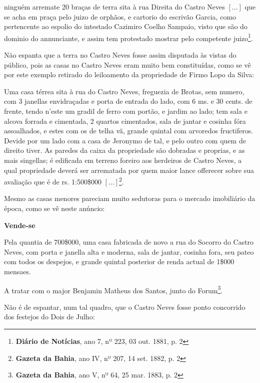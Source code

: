 \begin{citacao}
ninguém arremate 20 braças de terra sita à rua Direita do Castro Neves \([\dots]\) que se acha em praça pelo juizo de orphãos, e cartorio do escrivão Garcia, como pertencente ao espolio do intestado Cazimiro Coelho Sampaio, visto que são do dominio do annunciante, e assim tem protestado mostrar pelo competente juizo\footnote{\textbf{Diário de Notícias}, ano 7, nº 223, 03 out. 1881, p. 2}.
\end{citacao}

Não espanta que a terra no Castro Neves fosse assim disputada às vistas do público, pois as casas no Castro Neves eram muito bem constituídas, como se vê por este exemplo retirado do leiloamento da propriedade de Firmo Lopo da Silva:

\begin{citacao}
Uma casa térrea sita à rua do Castro Neves, freguezia de Brotas, sem numero, com 3 janellas envidraçadas e porta de entrada do lado, com 6 ms. e 30 cents. de frente, tendo n'este um gradil de ferro com portão, e jardim ao lado; tem sala e alcova forrada e cimentada, 2 quartos cimentados, sala de jantar e cosinha fóra assoalhados, e estes com os de telha vã, grande quintal com arvoredos fructiferos. Devide por um lado com a casa de Jeronymo de tal, e pelo outro com quem de direito tiver. As paredes da caixa da propriedade são dobradas e proprias, e as mais singellas; é edificada em terreno foreiro aos herdeiros de Castro Neves, a qual propriedade deverá ser arrematada por quem maior lance offerecer sobre sua avaliação que é de rs. 1:500\$000 \([\dots]\)\footnote{\textbf{Gazeta da Bahia}, ano IV, nº 207, 14 set. 1882, p. 2}.
\end{citacao}

Mesmo as casas menores pareciam muito sedutoras para o mercado imobiliário da época, como se vê neste anúncio:

\begin{citacao}
\textbf{Vende-se}

Pela quantia de 700\$000, uma casa fabricada de novo a rua do Socorro do Castro Neves, com porta e janella alta e moderna, sala de jantar, cosinha fora, seu pateo com todos os despejos, e grande quintal posterior de renda actual de 1\$000 mensaes.

A tratar com o major Benjamin Matheus dos Santos, junto do Forum\footnote{\textbf{Gazeta da Bahia}, ano V, nº 64, 25 mar. 1883, p. 2}.
\end{citacao}

Não é de espantar, num tal quadro, que o Castro Neves fosse ponto concorrido dos festejos do Dois de Julho:


